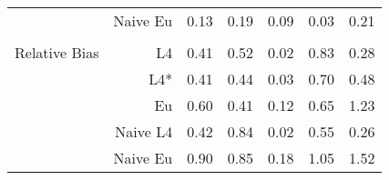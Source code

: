 \documentclass[a4paper,12pt,twoside]{book}
\begin{document}
\begin{table}[H]
\begin{tabular}{crrrrrr}
&Naive Eu &  0.13 & 0.19 & 0.09 & 0.03 & 0.21 \\ \\
  
   \hline
   
{\color{blue} Relative Bias } & L4  &0.41 & 0.52 & 0.02 & 0.83 & 0.28 \\ 
  
&L4*  &0.41 & 0.44 & 0.03 & 0.70 & 0.48 \\ 
  
 
  
&Eu &  
  0.60 & 0.41 & 0.12 & 0.65 & 1.23 \\ 
 
 
&Naive L4&  
  
   0.42 & 0.84 & 0.02 & 0.55 & 0.26 \\   
  
  
&Naive Eu &  
  0.90 & 0.85 & 0.18 & 1.05 & 1.52 \\ 
 
\end{tabular}

\end{table}
\end{document}
